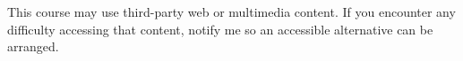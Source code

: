 This course may use third-party web or multimedia content. If you encounter any
difficulty accessing that content, notify me so an accessible alternative can be
arranged.
